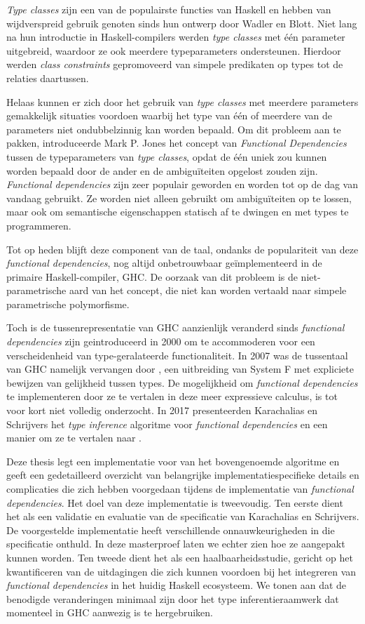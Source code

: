 \textit{Type classes} zijn een van de populairste functies van Haskell en hebben
van wijdverspreid gebruik genoten sinds hun ontwerp door Wadler en Blott.  Niet
lang na hun introductie in Haskell-compilers werden \textit{type classes} met
één parameter uitgebreid, waardoor ze ook meerdere typeparameters ondersteunen.
Hierdoor werden \textit{class constraints} gepromoveerd van simpele predikaten
op types tot de relaties daartussen.

Helaas kunnen er zich door het gebruik van \textit{type classes} met meerdere
parameters gemakkelijk situaties voordoen waarbij het type van één of meerdere
van de parameters niet ondubbelzinnig kan worden bepaald. Om dit probleem aan te
pakken, introduceerde Mark P. Jones het concept van \textit{Functional
Dependencies} tussen de typeparameters van \textit{type classes}, opdat de één
uniek zou kunnen worden bepaald door de ander en de ambiguïteiten opgelost
zouden zijn. \textit{Functional dependencies} zijn zeer populair geworden en
worden tot op de dag van vandaag gebruikt. Ze worden niet alleen gebruikt om
ambiguïteiten op te lossen, maar ook om semantische eigenschappen statisch af te
dwingen en met types te programmeren.

Tot op heden blijft deze component van de taal, ondanks de populariteit van deze
\textit{functional dependencies}, nog altijd onbetrouwbaar geïmplementeerd in de
primaire Haskell-compiler, GHC. De oorzaak van dit probleem is de
niet-parametrische aard van het concept, die niet kan worden vertaald naar
simpele parametrische polymorfisme.

Toch is de tussenrepresentatie van GHC aanzienlijk veranderd sinds
\textit{functional dependencies} zijn geintroduceerd in 2000 om te accommoderen
voor een verscheidenheid van type-geralateerde functionaliteit. In 2007 was de
tussentaal van GHC namelijk vervangen door \systemfc, een uitbreiding van System
F met expliciete bewijzen van gelijkheid tussen types.  De mogelijkheid om
\textit{functional dependencies} te implementeren door ze te vertalen in deze
meer expressieve calculus, is tot voor kort niet volledig onderzocht. In 2017
presenteerden Karachalias en Schrijvers het \textit{type inference} algoritme
voor \textit{functional dependencies} en een manier om ze te vertalen naar
\systemfc.

Deze thesis legt een implementatie voor van het bovengenoemde algoritme en geeft
een gedetailleerd overzicht van belangrijke implementatiespecifieke details en
complicaties die zich hebben voorgedaan tijdens de implementatie van
\textit{functional dependencies}.
%
Het doel van deze implementatie is tweevoudig.
%
Ten eerste dient het als een validatie en evaluatie van de specificatie van
Karachalias en Schrijvers. De voorgestelde implementatie heeft verschillende
onnauwkeurigheden in die specificatie onthuld. In deze masterproef laten we
echter zien hoe ze aangepakt kunnen worden.
%
Ten tweede dient het als een haalbaarheidsstudie, gericht op het kwantificeren
van de uitdagingen die zich kunnen voordoen bij het integreren van
\textit{functional dependencies} in het huidig Haskell ecosysteem. We tonen aan
dat de benodigde veranderingen minimaal zijn door het type inferentieraamwerk
dat momenteel in GHC aanwezig is te hergebruiken.
